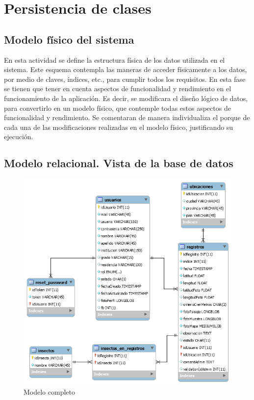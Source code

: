 \section{Persistencia de clases}

    \subsection{Modelo físico del sistema}
        En esta actividad se define la estructura física de los datos utilizada en el sistema. 
        Este esquema contempla las maneras de acceder físicamente a los datos, por medio de claves, índices, etc., para cumplir todos los requisitos. 
        En esta fase se tienen que tener en cuenta aspectos de funcionalidad y rendimiento en el funcionamiento de la aplicación. Es decir, se modificara el diseño lógico de datos, para convertirlo en un modelo físico, que contemple todas estos aspectos de funcionalidad y rendimiento. Se comentaran de manera individualiza el porque de cada una de las modificaciones realizadas en el modelo físico, justificando su ejecución.

		\subsection{Modelo relacional. Vista de la base de datos}
			\begin{figure}[H]
				\centering
				\includegraphics[width=1\textwidth]{imagenes/implementacion/db.png}
				\caption{Modelo completo}
				\label{diagrama-despliegue}
			\end{figure}